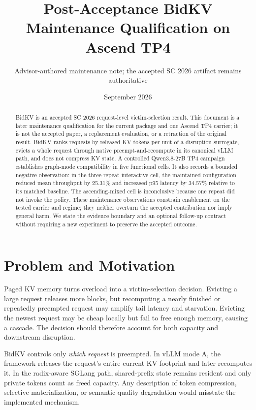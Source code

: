 \documentclass[10pt,twocolumn]{article}
\title{Post-Acceptance BidKV Maintenance Qualification on Ascend TP4}
\author{Advisor-authored maintenance note; the accepted SC 2026 artifact remains authoritative}
\date{September 2026}
\begin{document}
\maketitle

\begin{abstract}
BidKV is an accepted SC 2026 request-level victim-selection result. This document is a later maintenance qualification for the current package and one Ascend TP4 carrier; it is not the accepted paper, a replacement evaluation, or a retraction of the original result. BidKV ranks requests by released KV tokens per unit of a disruption surrogate, evicts a whole request through native preempt-and-recompute in its canonical vLLM path, and does not compress KV state. A controlled Qwen3.8-27B TP4 campaign establishes graph-mode compatibility in five functional cells. It also records a bounded negative observation: in the three-repeat interactive cell, the maintained configuration reduced mean throughput by 25.31\% and increased p95 latency by 34.57\% relative to its matched baseline. The ascending-mixed cell is inconclusive because one repeat did not invoke the policy. These maintenance observations constrain enablement on the tested carrier and regime; they neither overturn the accepted contribution nor imply general harm. We state the evidence boundary and an optional follow-up contract without requiring a new experiment to preserve the accepted outcome.
\end{abstract}

\section{Problem and Motivation}
Paged KV memory turns overload into a victim-selection decision. Evicting a large request releases more blocks, but recomputing a nearly finished or repeatedly preempted request may amplify tail latency and starvation. Evicting the newest request may be cheap locally but fail to free enough memory, causing a cascade. The decision should therefore account for both capacity and downstream disruption.

BidKV controls only \emph{which request} is preempted. In vLLM mode A, the framework releases the request's entire current KV footprint and later recomputes it. In the radix-aware SGLang path, shared-prefix state remains resident and only private tokens count as freed capacity. Any description of token compression, selective materialization, or semantic quality degradation would misstate the implemented mechanism.
\end{document}
